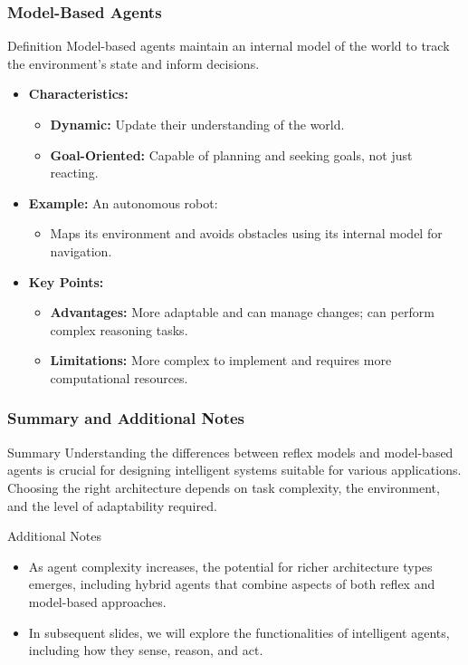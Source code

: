 \documentclass[aspectratio=169]{beamer}
\begin{document}
\begin{frame}[fragile]
    \frametitle{Model-Based Agents}
    \begin{block}{Definition}
        Model-based agents maintain an internal model of the world to track the environment's state and inform decisions.
    \end{block}
    \begin{itemize}
        \item \textbf{Characteristics:}
        \begin{itemize}
            \item \textbf{Dynamic:} Update their understanding of the world.
            \item \textbf{Goal-Oriented:} Capable of planning and seeking goals, not just reacting.
        \end{itemize}

        \item \textbf{Example:} An autonomous robot:
        \begin{itemize}
            \item Maps its environment and avoids obstacles using its internal model for navigation.
        \end{itemize}
        
        \item \textbf{Key Points:}
        \begin{itemize}
            \item \textbf{Advantages:} More adaptable and can manage changes; can perform complex reasoning tasks.
            \item \textbf{Limitations:} More complex to implement and requires more computational resources.
        \end{itemize}
    \end{itemize}
\end{frame}

\begin{frame}[fragile]
    \frametitle{Summary and Additional Notes}
    \begin{block}{Summary}
        Understanding the differences between reflex models and model-based agents is crucial for designing intelligent systems suitable for various applications.
        Choosing the right architecture depends on task complexity, the environment, and the level of adaptability required.
    \end{block}
    
    \begin{block}{Additional Notes}
        \begin{itemize}
            \item As agent complexity increases, the potential for richer architecture types emerges, including hybrid agents that combine aspects of both reflex and model-based approaches.
            \item In subsequent slides, we will explore the functionalities of intelligent agents, including how they sense, reason, and act.
        \end{itemize}
    \end{block}
\end{frame}
\end{document}
